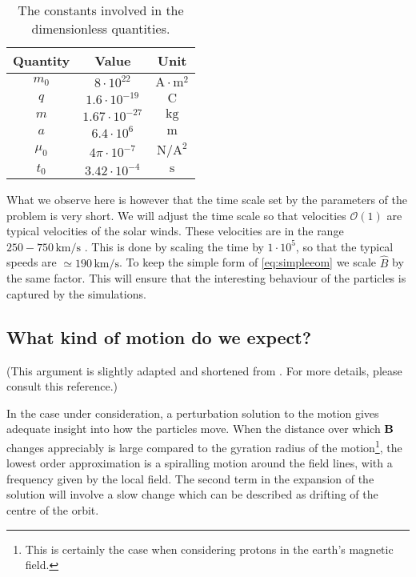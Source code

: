 \begin{table}[h]
	\centering
	\caption{The constants involved in the dimensionless quantities.}
	
	\begin{tabular}{ccc}
		\toprule
		Quantity & Value & Unit \\
		\midrule
		$m_0$ & $8   \cdot 10^{22}$ & $\text{A} \cdot \text{m}^2$ \\
		$q$   & $1.6 \cdot 10^{-19}$ & $\text{C}$ \\
		$m$   & $1.67 \cdot 10^{-27}$ & $\text{kg}$ \\
		$a$   & $6.4 \cdot 10^{6}$   & $\text{m}$ \\
		$\mu_0$ &$4\pi \cdot 10 ^{-7}$ & $\text{N}/{\text{A}^2}$ \\
		$t_0$ & $3.42 \cdot 10^{-4}$ & $\text{s}$ \\
		\bottomrule
	\end{tabular}
\end{table}

What we observe here is however that the time scale set by the parameters of the problem is very short. We will adjust the time scale so that velocities $\mathcal{O}(1)$ are typical velocities of the solar winds. These velocities are in the range $250-750 \, \text{km}/\text{s}$ \cite{Khabarova_2018}. This is done by scaling the time by $1\cdot10^5$, so that the typical speeds are $\simeq 190 \, \text{km}/\text{s}$. To keep the simple form of \eqref{eq:simpleeom} we scale $\hat{B}$ by the same factor. This will ensure that the interesting behaviour of the particles is captured by the simulations. 

\subsection*{What kind of motion do we expect?}\label{sec:motion}

(This argument is slightly adapted and shortened from \cite[sec.~12.4]{Jackson:100964}. For more details, please consult this reference.) 

In the case under consideration, a perturbation solution to the motion gives adequate insight into how the particles move. When the distance over which $\mathbf{B}$ changes appreciably is large compared to the gyration radius of the motion\footnote{This is certainly the case when considering protons in the earth's magnetic field.}, the lowest order approximation is a spiralling motion around the field lines, with a frequency given by the local field. The second term in the expansion of the solution will involve a slow change which can be described as drifting of the centre of the orbit. 

